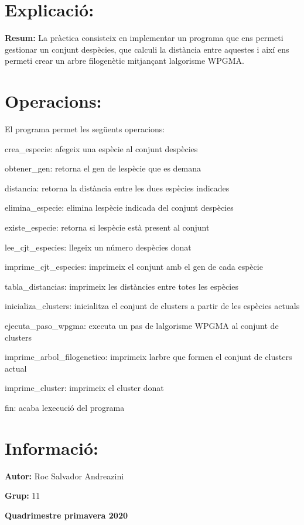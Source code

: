 \hypertarget{index_exp}{}\section{Explicació\+:}\label{index_exp}
{\bfseries  Resum\+: } La pràctica consisteix en implementar un programa que ens permeti gestionar un conjunt d\textquotesingle{}espècies, que calculi la distància entre aquestes i així ens permeti crear un arbre filogenètic mitjançant l\textquotesingle{}algorisme W\+P\+G\+MA.\hypertarget{index_op}{}\section{Operacions\+:}\label{index_op}
El programa permet les següents operacions\+:


\begin{DoxyItemize}
\item crea\+\_\+especie\+: afegeix una espècie al conjunt d\textquotesingle{}espècies
\item obtener\+\_\+gen\+: retorna el gen de l\textquotesingle{}espècie que es demana
\item distancia\+: retorna la distància entre les dues espècies indicades
\item elimina\+\_\+especie\+: elimina l\textquotesingle{}espècie indicada del conjunt d\textquotesingle{}espècies
\item existe\+\_\+especie\+: retorna si l\textquotesingle{}espècie està present al conjunt
\item lee\+\_\+cjt\+\_\+especies\+: llegeix un número d\textquotesingle{}espècies donat
\item imprime\+\_\+cjt\+\_\+especies\+: imprimeix el conjunt amb el gen de cada espècie
\item tabla\+\_\+distancias\+: imprimeix les distàncies entre totes les espècies
\item inicializa\+\_\+clusters\+: inicialitza el conjunt de clusters a partir de les espècies actuals
\item ejecuta\+\_\+paso\+\_\+wpgma\+: executa un pas de l\textquotesingle{}algorisme W\+P\+G\+MA al conjunt de clusters
\item imprime\+\_\+arbol\+\_\+filogenetico\+: imprimeix l\textquotesingle{}arbre que formen el conjunt de clusters actual
\item imprime\+\_\+cluster\+: imprimeix el cluster donat
\item fin\+: acaba l\textquotesingle{}execució del programa
\end{DoxyItemize}\hypertarget{index_inf}{}\section{Informació\+:}\label{index_inf}
{\bfseries  Autor\+: } Roc Salvador Andreazini

{\bfseries  Grup\+: } 11

{\bfseries  Quadrimestre primavera 2020 } 